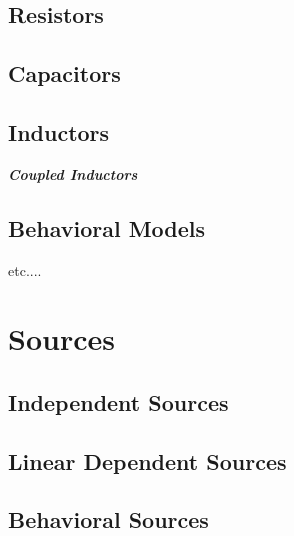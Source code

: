 \subsection{Resistors}
\label{subsec_sceadm_resistors}

\subsection{Capacitors}
\label{subsec_sceadm_capacitors}

\subsection{Inductors}
\label{subsec_sceadm_inductors}

\textit{\textbf{Coupled Inductors}}

\subsection{Behavioral Models}
\label{subsec_sceadm_behavioralmodels}

{\Large etc....}

\section{Sources}
\label{sec_sceadm_sources}

\subsection{Independent Sources}
\label{subsec_sceadm_independentsources}

\subsection{Linear Dependent Sources}
\label{subsec_sceadm_lineardependentsources}

\subsection{Behavioral Sources}
\label{subsec_sceadm_behavioralsources}

